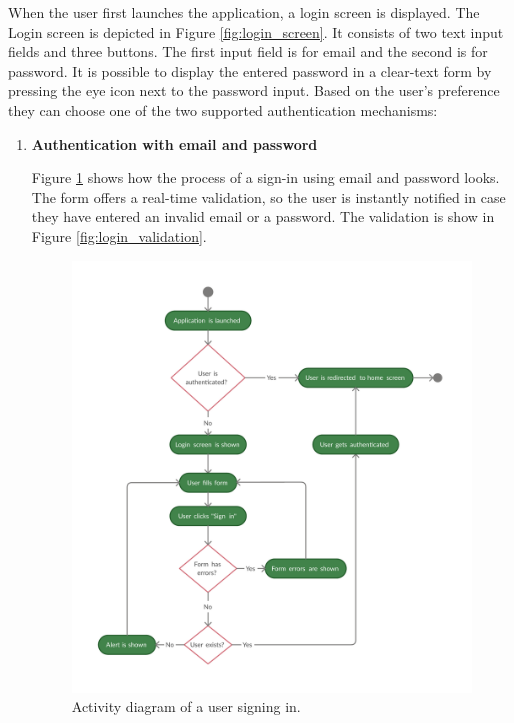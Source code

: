 \documentclass[
  digital, %
  table,   %
  oneside, %
  lof,     %
  lot,     %
]{fithesis3}
\begin{document}
When the user first launches the application, a login screen is displayed. The Login screen is depicted in Figure \ref{fig:login_screen}. It consists of two text input fields and three buttons. The first input field is for email and the second is for password. It is possible to display the entered password in a clear-text form by pressing the eye icon next to the password input. Based on the user's preference they can choose one of the two supported authentication mechanisms:
\begin{enumerate}
    \item \textbf{Authentication with email and password}
    
    Figure \ref{fig:sign_in_flow} shows how the process of a sign-in using email and password looks. The form offers a real-time validation, so the user is instantly notified in case they have entered an invalid email or a password. The validation is show in Figure \ref{fig:login_validation}.
    
    \begin{figure}
        \begin{center}
            \includegraphics[width=\textwidth]{figures/diagrams/Sign_in_flow}
        \end{center}
        \caption{Activity diagram of a user signing in.}
        \label{fig:sign_in_flow}
    \end{figure}
    

\end{enumerate}
\end{document}
